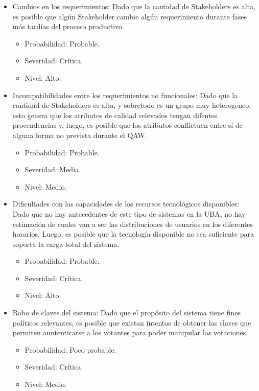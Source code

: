 \begin{itemize}
\bigskip

\item Cambios en los requerimientos: Dado que la cantidad de Stakeholders es alta, es posible que alg\'un Stakeholder cambie alg\'un requerimiento durante fases m\'as tard\'ias del proceso productivo.
\begin{itemize}
\item Probabilidad: Probable.
\item Severidad: Cr\'itica.
\item Nivel: Alto.
\end{itemize}

\bigskip

\item Incompatibilidades entre los requerimientos no funcionales: Dado que la cantidad de Stakeholders es alta, y sobretodo es un grupo muy heterogeneo, esto genera que los atributos de calidad relevados tengan difentes procendencias y, luego, es posible que los atributos conflictuen entre s\'i de alguna forma no prevista durante el QAW.
\begin{itemize}
\item Probabilidad: Probable.
\item Severidad: Media.
\item Nivel: Medio.
\end{itemize}

\bigskip

\item Dificultades con las capacidades de los recursos tecnol\'ogicos disponibles: Dado que no hay antecedentes de este tipo de sistemas en la UBA, no hay estimaci\'on de cuales van a ser las distribuciones de usuarios en los diferentes horarios. Luego, es posible que la tecnolog\'ia disponible no sea suficiente para soporta la carga total del sistema.
\begin{itemize}
\item Probabilidad: Probable.
\item Severidad: Cr\'itica.
\item Nivel: Alto.
\end{itemize}

\bigskip

\item Robo de claves del sistema: Dado que el prop\'osito del sistema tiene fines pol\'iticos relevantes, es posible que existan intentos de obtener las claves que permiten auntenticarse a los votantes para poder manipular las votaciones.
\begin{itemize}
\item Probabilidad: Poco probable.
\item Severidad: Cr\'itica.
\item Nivel: Medio.
\end{itemize}



\end{itemize}
